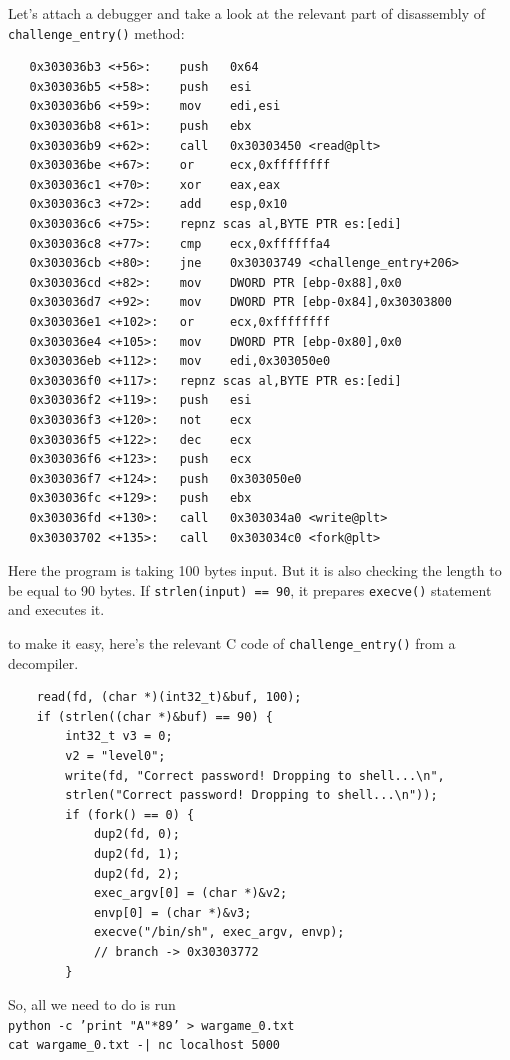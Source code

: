\documentclass[12pt, bibliography=totocnumbered]{article}
\begin{document}
Let's attach a debugger and take a look at the relevant part of disassembly of \texttt{challenge\_entry()} method:


\begin{verbatim}
   0x303036b3 <+56>:	push   0x64
   0x303036b5 <+58>:	push   esi
   0x303036b6 <+59>:	mov    edi,esi
   0x303036b8 <+61>:	push   ebx
   0x303036b9 <+62>:	call   0x30303450 <read@plt>
   0x303036be <+67>:	or     ecx,0xffffffff
   0x303036c1 <+70>:	xor    eax,eax
   0x303036c3 <+72>:	add    esp,0x10
   0x303036c6 <+75>:	repnz scas al,BYTE PTR es:[edi]
   0x303036c8 <+77>:	cmp    ecx,0xffffffa4
   0x303036cb <+80>:	jne    0x30303749 <challenge_entry+206>
   0x303036cd <+82>:	mov    DWORD PTR [ebp-0x88],0x0
   0x303036d7 <+92>:	mov    DWORD PTR [ebp-0x84],0x30303800
   0x303036e1 <+102>:	or     ecx,0xffffffff
   0x303036e4 <+105>:	mov    DWORD PTR [ebp-0x80],0x0
   0x303036eb <+112>:	mov    edi,0x303050e0
   0x303036f0 <+117>:	repnz scas al,BYTE PTR es:[edi]
   0x303036f2 <+119>:	push   esi
   0x303036f3 <+120>:	not    ecx
   0x303036f5 <+122>:	dec    ecx
   0x303036f6 <+123>:	push   ecx
   0x303036f7 <+124>:	push   0x303050e0
   0x303036fc <+129>:	push   ebx
   0x303036fd <+130>:	call   0x303034a0 <write@plt>
   0x30303702 <+135>:	call   0x303034c0 <fork@plt>
   \end{verbatim}

Here the program is taking 100 bytes input. But it is also checking the length to be equal to 90 bytes. If \texttt{strlen(input) == 90}, it prepares \texttt{execve()} statement and executes it.
\par to make it easy, here's the relevant C code of \texttt{challenge\_entry()} from a decompiler.
\begin{verbatim}
    read(fd, (char *)(int32_t)&buf, 100);
    if (strlen((char *)&buf) == 90) {
        int32_t v3 = 0;
        v2 = "level0";
        write(fd, "Correct password! Dropping to shell...\n", 
        strlen("Correct password! Dropping to shell...\n"));
        if (fork() == 0) {
            dup2(fd, 0);
            dup2(fd, 1);
            dup2(fd, 2);
            exec_argv[0] = (char *)&v2;
            envp[0] = (char *)&v3;
            execve("/bin/sh", exec_argv, envp);
            // branch -> 0x30303772
        }
 \end{verbatim}

So, all we need to do is run \\ \texttt{python -c 'print "A"*89' > wargame\_0.txt}\\ \texttt{cat wargame\_0.txt -| nc localhost 5000}
\end{document}

